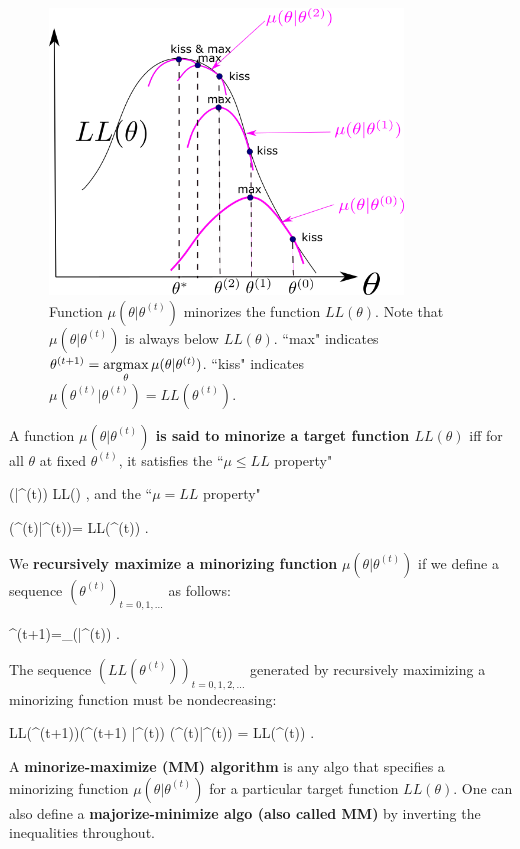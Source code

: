 \begin{figure}[h!]
\centering
\includegraphics[width=3.7in]
{emax/minorize.png}
\caption{Function $\mu(\theta|\theta^{(t)})$
minorizes the function $ LL(\theta)$.
Note that $\mu(\theta|\theta^{(t)})$
is always below
 $ LL(\theta)$.
``max" indicates
$\theta^{(t+1)}=
\mathop{\mathrm{argmax}}\limits_\theta \mu(\theta|\theta^{(t)})$.
``kiss" indicates
 $\mu(\theta^{(t)}|\theta^{(t)})=
 LL(\theta^{(t)})$.
}
\label{fig-minorize}
\end{figure}



A function {\bf $\mu(\theta|\theta^{(t)})$
is said to minorize
 a target
 function $ LL(\theta)$}
iff for all $ \theta$ at fixed
$\theta^{(t)}$,
it satisfies the
``$\mu\leq LL$ property"


\beq
\mu(\theta|\theta^{(t)})\leq
 LL(\theta)
\;,
\eeq
and
the ``$\mu= LL$ property"

\beq
\mu(\theta^{(t)}|\theta^{(t)})=
 LL(\theta^{(t)})
\;.
\eeq

We  {\bf recursively maximize a minorizing function} $\mu(\theta|\theta^{(t)})$
if we define a sequence $(\theta^{(t)})_{t=0, 1, \ldots}$
as follows:

\beq
\theta^{(t+1)}=\argmax_\theta \mu(\theta|\theta^{(t)})
\;.
\eeq

The sequence
$( LL(\theta^{(t)}))_{t=0, 1, 2, \ldots}$
generated by
recursively maximizing a minorizing function
must be nondecreasing:

\beq
 LL(\theta^{(t+1)})\geq \mu(\theta^{(t+1)}
|\theta^{(t)})\geq
 \mu(\theta^{(t)}|\theta^{(t)})
=  LL(\theta^{(t)})
\;.
\eeq

A {\bf
minorize-maximize (MM) algorithm}
is any algo that
specifies a
minorizing function $\mu(\theta|\theta^{(t)})$
for a particular target
 function $ LL(\theta)$.
One can also define a
{\bf majorize-minimize algo (also
called  MM)}
by inverting the inequalities throughout.


